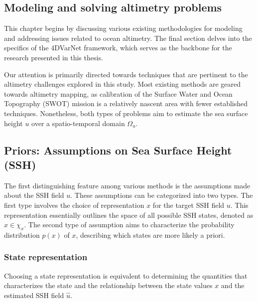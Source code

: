 \begin{bibunit}

  \chapter*{Modeling and solving altimetry problems}

This chapter begins by discussing various existing methodologies for modeling and addressing issues related to ocean altimetry. The final section delves into the specifics of the 4DVarNet framework, which serves as the backbone for the research presented in this thesis.

Our attention is primarily directed towards techniques that are pertinent to the altimetry challenges explored in this study. Most existing methods are geared towards altimetry mapping, as calibration of the Surface Water and Ocean Topography (SWOT) mission is a relatively nascent area with fewer established techniques. Nonetheless, both types of problems aim to estimate the sea surface height $u$ over a spatio-temporal domain $\Omega_u$.
 
 \section{Priors: Assumptions on Sea Surface Height (SSH)}
The first distinguishing feature among various methods is the assumptions made about the SSH field $u$. These assumptions can be categorized into two types.
The first type involves the choice of representation $x$ for the target SSH field $u$. This representation essentially outlines the space of all possible SSH states, denoted as $x \in \chi_x$.
The second type of assumption aims to characterize the probability distribution $p(x)$ of $x$, describing which states are more likely a priori.



 
  \subsection{State representation}
Choosing a state representation is equivalent to determining the quantities that characterizes the state and the relationship between the state values $x$ and the estimated SSH field $\hat{u}$.



\end{bibunit}
